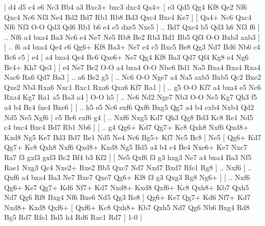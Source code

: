 \makegametitle 
|   d4   d5    c4   e6    Nc3   Bb4    a3   Bxc3+    bxc3   dxc4    Qa4+ [  e3 Qd5  Qg4 Kf8  Qe2 Nf6  Qxc4 Nc6  Nf3 Ne4  Bd2 Bd7  Rb1 Rb8  Bd3 Qxc4  Bxc4 Ke7   ]  [  Qa4+ Nc6  Qxc4 Nf6  Nf3 O-O  Qd3 Qd6  Rb1 b6  e4 e5  dxe5 Nxe5   ] .. Bd7    Qxc4   b5    Qd3   h6    Nf3   f6 [ .. Nf6  a4 bxa4  Ba3 Nc6  e4 Ne7  Ne5 Rb8  Be2 Rb3  Bd1 Bb5  Qf3 O-O  Bxb3 axb3   ]  [ .. f6  a4 bxa4  Qe4 c6  Qg6+ Kf8  Ba3+ Ne7  e4 c5  Bxc5 Be8  Qg3 Nd7  Bd6 Nb6  c4 Bc6  c5   ]  e4 [  a4 bxa4  Qe4 Bc6  Qxe6+ Ne7  Qg4 Kf8  Ba3 Qd7  Qf4 Kg8  e4 Ng6  Bc4+ Kh7  Qe3   ]  [  e4 Ne7  Be2 O-O  a4 bxa4  O-O Nbc6  Bd1 Na5  Bxa4 Bxa4  Rxa4 Nac6  Ra6 Qd7  Ba3   ] .. a6    Be2   g5 [ .. Nc6  O-O Nge7  a4 Na5  axb5 Bxb5  Qc2 Bxe2  Qxe2 Nb3  Rxa6 Nxc1  Rxc1 Rxa6  Qxa6 Kf7  Ra1   ]  [ .. g5  O-O Kf7  a4 bxa4  e5 Nc6  Rxa4 Kg7  Ra1 a5  Ba3 a4   ]  O-O   h5 [ .. Nc6  Nd2 Nge7  Nb3 O-O  Nc5 Kg7  Qh3 f5  a4 b4  Bc4 fxe4  Bxe6   ]  [ .. h5  e5 Nc6  exf6 Qxf6  Bxg5 Qg7  a4 b4  cxb4 Nxb4  Qd2 Nd5  Ne5 Ngf6   ]  e5   Bc6    exf6   g4 [ .. Nxf6  Nxg5 Kd7  Qh3 Qg8  Bd3 Kc8  Re1 Nd5  c4 bxc4  Bxc4 Bd7  Rb1 Nb6   ]  [ .. g4  Qg6+ Kd7  Qg7+ Kc8  Qxh8 Nxf6  Qxd8+ Kxd8  Ng5 Ke7  Bd3 Bd7  Re1 Nd5  Ne4 Nc6  Bg5+ Kf7  Nc5 Bc8   ]  Ne5 [  Qg6+ Kd7  Qg7+ Kc8  Qxh8 Nxf6  Qxd8+ Kxd8  Ng5 Bd5  a4 b4  c4 Be4  Nxe6+ Ke7  Nxc7 Ra7  f3 gxf3  gxf3 Bc2  Bf4 b3  Kf2   ]  [  Ne5 Qxf6  f3 g3  hxg3 Ne7  a4 bxa4  Ba3 Nf5  Rae1 Nxg3  Qc4 Nxe2+  Rxe2 Bb5  Qxc7 Nd7  Nxd7 Bxd7  Rfe1 Rg8   ] .. Nxf6 [ .. Qxf6  a4 bxa4  Ba3 Ne7  Bxe7 Qxe7  Qg6+ Kf8  f3 g3  Qxg3 Rg8  Ng6+   ]  [ .. Nxf6  Qg6+ Ke7  Qg7+ Kd6  Nf7+ Kd7  Nxd8+ Kxd8  Qxf6+ Kc8  Qxh8+ Kb7  Qxh5 Nd7  Qg6 Rf8  Bxg4 Nf6  Bxe6 Nd5  Qg3 Re8   ]  Qg6+   Ke7    Qg7+   Kd6    Nf7+   Kd7    Nxd8+   Kxd8    Qxf6+    [  Qxf6+ Kc8  Qxh8+ Kb7  Qxh5 Nd7  Qg6 Nb6  Bxg4 Rd8  Bg5 Rd7  Rfe1 Bd5  h4 Rd6  Rac1 Rd7   ] 1-0  |
